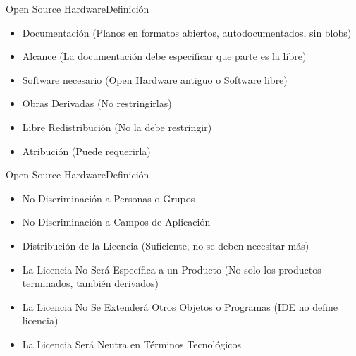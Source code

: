 \documentclass{beamer}
\begin{document}
\begin{frame}{Open Source Hardware}{Definición}
  \begin{itemize}
  \item Documentación (Planos en formatos abiertos, autodocumentados, sin blobs)
  \item Alcance (La documentación debe especificar que parte es la libre)
  \item Software necesario (Open Hardware antiguo o Software libre)
  \item Obras Derivadas (No restringirlas)
  \item Libre Redistribución (No la debe restringir)
  \item Atribución (Puede requerirla)
  \end{itemize}
\end{frame}

\begin{frame}{Open Source Hardware}{Definición}
  \begin{itemize}
  \item No Discriminación a Personas o Grupos
  \item No Discriminación a Campos de Aplicación
  \item Distribución de la Licencia (Suficiente, no se deben necesitar más)
  \item La Licencia No Será Específica a un Producto (No solo los productos terminados, también derivados)
  \item La Licencia No Se Extenderá Otros Objetos o Programas (IDE no define licencia)
  \item La Licencia Será Neutra en Términos Tecnológicos
  \end{itemize}
\end{frame}
\end{document}
